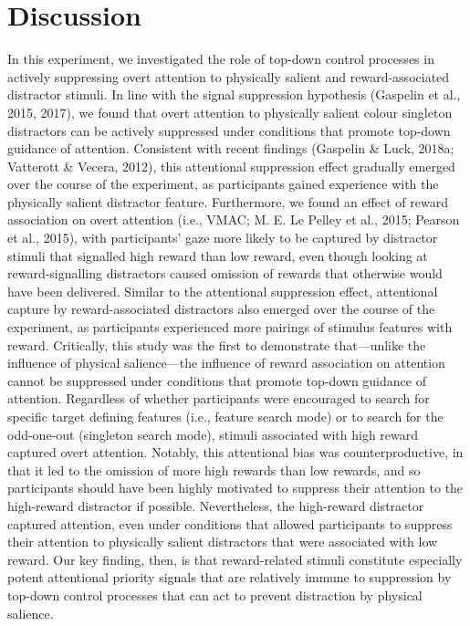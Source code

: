 \documentclass[jou, a4paper, noextraspace,floatsintext]{apa6}
\theoremstyle{definition}
\theoremstyle{definition}
\theoremstyle{definition}
\theoremstyle{remark}
\begin{document}
\section{Discussion}\label{discussion}

In this experiment, we investigated the role of top-down control
processes in actively suppressing overt attention to physically salient
and reward-associated distractor stimuli. In line with the signal
suppression hypothesis (Gaspelin et al., 2015, 2017), we found that
overt attention to physically salient colour singleton distractors can
be actively suppressed under conditions that promote top-down guidance
of attention. Consistent with recent findings (Gaspelin \& Luck, 2018a;
Vatterott \& Vecera, 2012), this attentional suppression effect
gradually emerged over the course of the experiment, as participants
gained experience with the physically salient distractor feature.
Furthermore, we found an effect of reward association on overt attention
(i.e., VMAC; M. E. Le Pelley et al., 2015; Pearson et al., 2015), with
participants' gaze more likely to be captured by distractor stimuli that
signalled high reward than low reward, even though looking at
reward-signalling distractors caused omission of rewards that otherwise
would have been delivered. Similar to the attentional suppression
effect, attentional capture by reward-associated distractors also
emerged over the course of the experiment, as participants experienced
more pairings of stimulus features with reward. Critically, this study
was the first to demonstrate that---unlike the influence of physical
salience---the influence of reward association on attention cannot be
suppressed under conditions that promote top-down guidance of attention.
Regardless of whether participants were encouraged to search for
specific target defining features (i.e., feature search mode) or to
search for the odd-one-out (singleton search mode), stimuli associated
with high reward captured overt attention. Notably, this attentional
bias was counterproductive, in that it led to the omission of more high
rewards than low rewards, and so participants should have been highly
motivated to suppress their attention to the high-reward distractor if
possible. Nevertheless, the high-reward distractor captured attention,
even under conditions that allowed participants to suppress their
attention to physically salient distractors that were associated with
low reward. Our key finding, then, is that reward-related stimuli
constitute especially potent attentional priority signals that are
relatively immune to suppression by top-down control processes that can
act to prevent distraction by physical salience.
\end{document}
